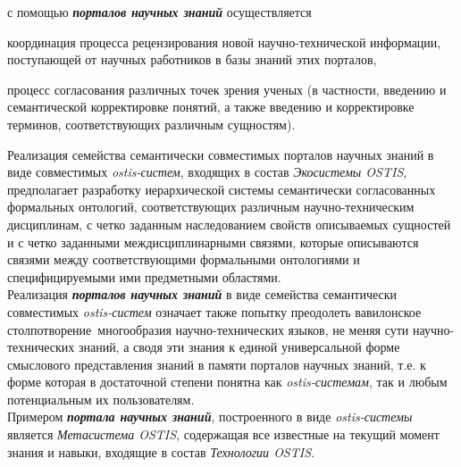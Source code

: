 \begin{SCn}
\begin{scnsubstruct}
{\begin{scnitemize}
            \item с помощью \textbf{\textit{порталов научных знаний}} осуществляется
            \begin{scnitemizeii}
                \item координация процесса рецензирования новой научно-технической информации, поступающей от научных работников в базы знаний этих порталов,
                \item процесс согласования различных точек зрения ученых (в частности, введению и семантической корректировке понятий, а также введению и корректировке терминов, соответствующих различным сущностям).
            \end{scnitemizeii}
        \end{scnitemize}
        Реализация семейства семантически совместимых порталов научных знаний в виде совместимых \textit{\mbox{ostis-систем}}, входящих в состав \textit{Экосистемы OSTIS}, предполагает разработку иерархической системы семантически согласованных формальных онтологий, соответствующих различным научно-техническим дисциплинам, с четко заданным наследованием свойств описываемых сущностей и с четко заданными междисциплинарными связями, которые описываются связями между соответствующими формальными онтологиями и специфицируемыми ими предметными областями.\\
        Реализация \textbf{\textit{порталов научных знаний}} в виде семейства семантически совместимых \textit{ostis-систем} означает также попытку преодолеть вавилонское столпотворение\ многообразия научно-технических языков, не меняя сути научно-технических знаний, а сводя эти знания к единой универсальной форме смыслового представления знаний в памяти порталов научных знаний, т.е. к форме которая в достаточной степени понятна как \textit{ostis-системам}, так и любым потенциальным их пользователям.\\
        Примером \textbf{\textit{портала научных знаний}}, построенного в виде \textit{ostis-системы} является \textit{Метасистема OSTIS}, содержащая все известные на текущий момент знания и навыки, входящие в состав \textit{Технологии OSTIS}.}
    \bigskip
    
    \end{scnsubstruct}
    \scnendcurrentsectioncomment
\end{SCn}
